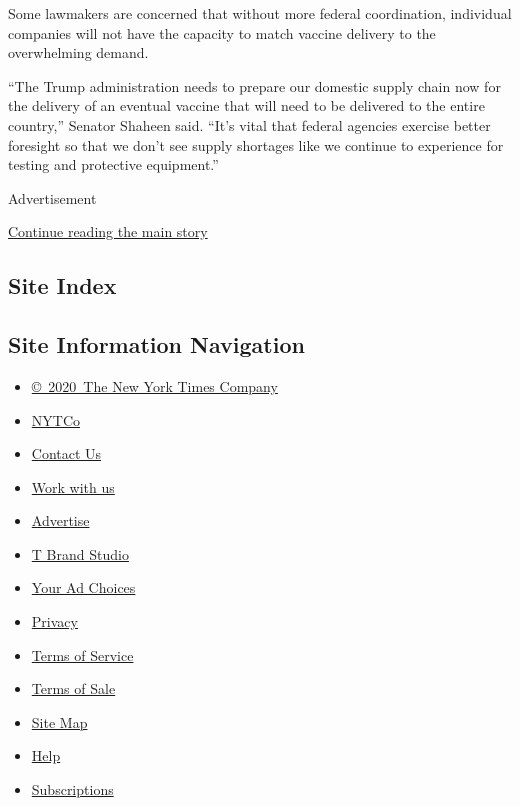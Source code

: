 Some lawmakers are concerned that without more federal coordination,
individual companies will not have the capacity to match vaccine
delivery to the overwhelming demand.

``The Trump administration needs to prepare our domestic supply chain
now for the delivery of an eventual vaccine that will need to be
delivered to the entire country,'' Senator Shaheen said. ``It's vital
that federal agencies exercise better foresight so that we don't see
supply shortages like we continue to experience for testing and
protective equipment.''

Advertisement

\protect\hyperlink{after-bottom}{Continue reading the main story}

\hypertarget{site-index}{%
\subsection{Site Index}\label{site-index}}

\hypertarget{site-information-navigation}{%
\subsection{Site Information
Navigation}\label{site-information-navigation}}

\begin{itemize}
\tightlist
\item
  \href{https://help.nytimes3xbfgragh.onion/hc/en-us/articles/115014792127-Copyright-notice}{©~2020~The
  New York Times Company}
\end{itemize}

\begin{itemize}
\tightlist
\item
  \href{https://www.nytco.com/}{NYTCo}
\item
  \href{https://help.nytimes3xbfgragh.onion/hc/en-us/articles/115015385887-Contact-Us}{Contact
  Us}
\item
  \href{https://www.nytco.com/careers/}{Work with us}
\item
  \href{https://nytmediakit.com/}{Advertise}
\item
  \href{http://www.tbrandstudio.com/}{T Brand Studio}
\item
  \href{https://www.nytimes3xbfgragh.onion/privacy/cookie-policy\#how-do-i-manage-trackers}{Your
  Ad Choices}
\item
  \href{https://www.nytimes3xbfgragh.onion/privacy}{Privacy}
\item
  \href{https://help.nytimes3xbfgragh.onion/hc/en-us/articles/115014893428-Terms-of-service}{Terms
  of Service}
\item
  \href{https://help.nytimes3xbfgragh.onion/hc/en-us/articles/115014893968-Terms-of-sale}{Terms
  of Sale}
\item
  \href{https://spiderbites.nytimes3xbfgragh.onion}{Site Map}
\item
  \href{https://help.nytimes3xbfgragh.onion/hc/en-us}{Help}
\item
  \href{https://www.nytimes3xbfgragh.onion/subscription?campaignId=37WXW}{Subscriptions}
\end{itemize}
